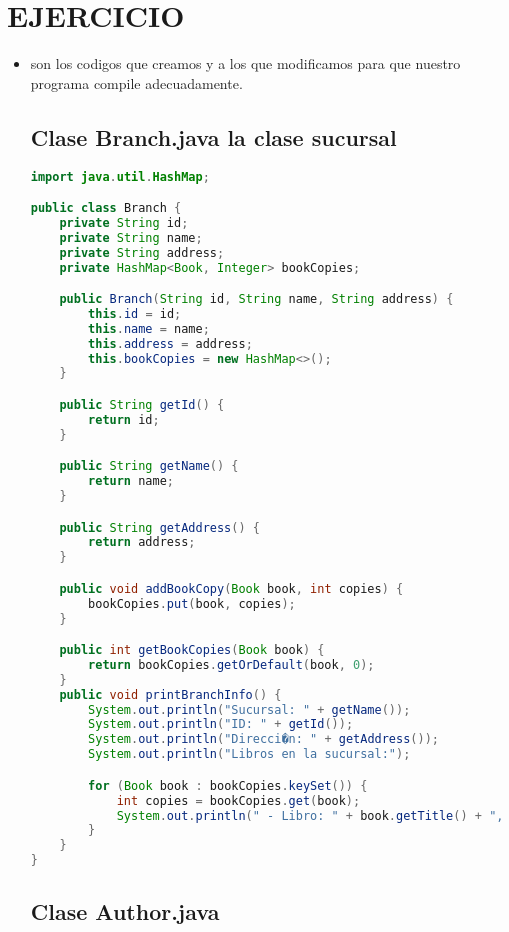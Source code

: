 \documentclass{article}
\begin{document}
    \section{EJERCICIO}
	\begin{itemize}
 \item son los codigos que creamos y a los que modificamos para que nuestro programa compile adecuadamente.
        \subsection{Clase Branch.java la clase sucursal}

        \begin{lstlisting}[language=java]
import java.util.HashMap;

public class Branch {
    private String id;
    private String name;
    private String address;
    private HashMap<Book, Integer> bookCopies;

    public Branch(String id, String name, String address) {
        this.id = id;
        this.name = name;
        this.address = address;
        this.bookCopies = new HashMap<>();
    }

    public String getId() {
        return id;
    }

    public String getName() {
        return name;
    }

    public String getAddress() {
        return address;
    }

    public void addBookCopy(Book book, int copies) {
        bookCopies.put(book, copies);
    }

    public int getBookCopies(Book book) {
        return bookCopies.getOrDefault(book, 0);
    }
    public void printBranchInfo() {
        System.out.println("Sucursal: " + getName());
        System.out.println("ID: " + getId());
        System.out.println("Direcci�n: " + getAddress());
        System.out.println("Libros en la sucursal:");

        for (Book book : bookCopies.keySet()) {
            int copies = bookCopies.get(book);
            System.out.println(" - Libro: " + book.getTitle() + ", Ejemplares: " + copies);
        }
    }
}

        \end{lstlisting}

        \subsection{Clase Author.java}


\end{itemize}
\end{document}
